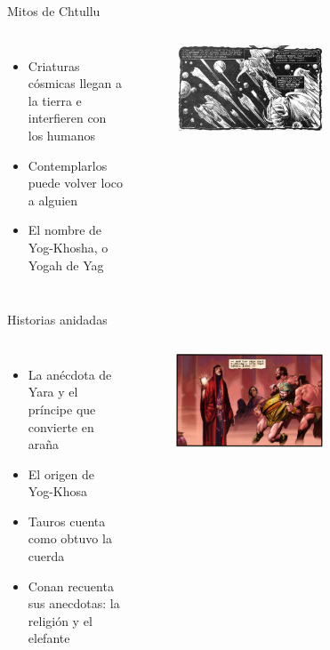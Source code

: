 \begin{frame}{Mitos de Chtullu}
\begin{columns}
 \begin{itemize}
    \item Criaturas cósmicas llegan a la tierra e interfieren con los humanos
    \item Contemplarlos puede volver loco a alguien
    \item El nombre de Yog-Khosha, o Yogah de Yag
 \end{itemize}
    \begin{figure}[htb]
      \centering
      \includegraphics[width=0.6\textwidth]{img/tropes/mitos}
    \end{figure} 
  \end{columns} 
\end{frame}

\begin{frame}{Historias anidadas}
\begin{columns}
 \begin{itemize}
    \item La anécdota de Yara y el príncipe que convierte en araña
    \item El origen de Yog-Khosa
    \item Tauros cuenta como obtuvo la cuerda
    \item Conan recuenta sus anecdotas: la religión y el elefante
 \end{itemize}
    \begin{figure}[htb]
      \centering
      \includegraphics[width=0.6\textwidth]{img/tropes/historias}
    \end{figure} 
  \end{columns} 
\end{frame}

